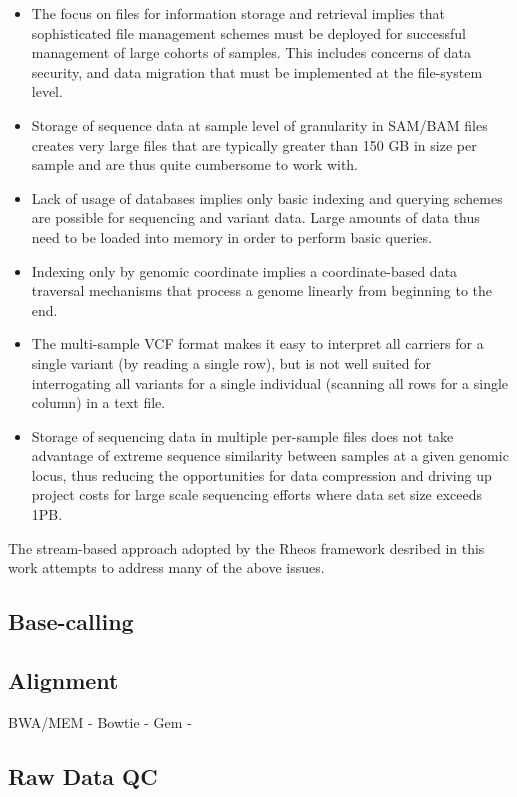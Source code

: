 \begin{itemize}
    \item The focus on files for information storage and retrieval implies that sophisticated file management schemes must be deployed for successful management of large cohorts of samples. This includes concerns of data security, and data migration that must be implemented at the file-system level.
    \item Storage of sequence data at sample level of granularity in SAM/BAM files creates very large files that are typically greater than 150 GB in size per sample and are thus quite cumbersome to work with.
    \item Lack of usage of databases implies only basic indexing and querying schemes are possible for sequencing and variant data. Large amounts of data thus need to be loaded into memory in order to perform basic queries.
    \item Indexing only by genomic coordinate implies a coordinate-based data traversal mechanisms that process a genome linearly from beginning to the end.
    \item The multi-sample VCF format makes it easy to interpret all carriers for a single variant (by reading a single row), but is not well suited for interrogating all variants for a single individual (scanning all rows for a single column) in a text file.
    \item Storage of sequencing data in multiple per-sample files does not take advantage of extreme sequence similarity between samples at a given genomic locus, thus reducing the opportunities for data compression and driving up project costs for large scale sequencing efforts where data set size exceeds 1PB.
\end{itemize}

The stream-based approach adopted by the Rheos framework desribed in this work attempts to address many of the above issues.

\subsection{Base-calling}

\subsection{Alignment}
\label{sec:bg_alignment}


BWA/MEM -
Bowtie - 
Gem - 

\subsection{Raw Data QC}
\label{sec:bg_raw_data_qc}

